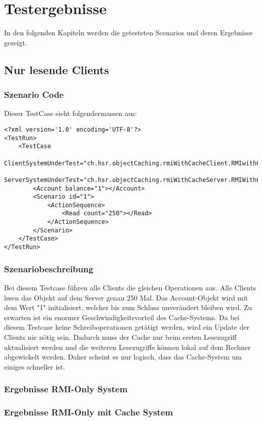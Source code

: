 \section{Testergebnisse}
In den folgenden Kapiteln werden die getesteten Scenarios und deren Ergebnisse gezeigt. 

\subsection{Nur lesende Clients}
\subsubsection{Szenario Code}
Dieser TestCase sieht folgendermassen aus:
\begin{lstlisting}
<?xml version='1.0' encoding='UTF-8'?>
<TestRun>
	<TestCase
		ClientSystemUnderTest="ch.hsr.objectCaching.rmiWithCacheClient.RMIwithCacheClientSystem"
		ServerSystemUnderTest="ch.hsr.objectCaching.rmiWithCacheServer.RMIWithCacheServerSystem">
		<Account balance="1"></Account>
		<Scenario id="1">
			<ActionSequence>
				<Read count="250"></Read>
			</ActionSequence>
		</Scenario>
	</TestCase>
</TestRun>
\end{lstlisting}

\subsubsection{Szenariobeschreibung}
Bei diesem Testcase führen alle Clients die gleichen Operationen aus. Alle Clients lesen das Objekt auf dem Server genau 250 Mal. Das Account-Objekt wird mit dem Wert "1" initialisiert, welcher bis zum Schluss unverändert bleiben wird. \newline
Zu erwarten ist ein enormer Geschwindigkeitsvorteil des Cache-Systems. Da bei diesem Testcase keine Schreiboperationen getätigt werden, wird ein Update der Clients nie nötig sein. Dadurch muss der Cache nur beim ersten Lesezugriff aktualisiert werden und die weiteren Lesezugriffe können lokal auf dem Rechner abgewickelt werden. Daher scheint es nur logisch, dass das Cache-System um einiges schneller ist.

\subsubsection{Ergebnisse RMI-Only System}

\subsubsection{Ergebnisse RMI-Only mit Cache System}


